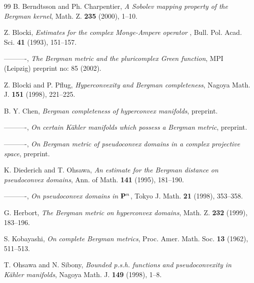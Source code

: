 \documentclass[12pt]{article}
\begin{document}
\begin{thebibliography}{99}
  B. Berndtsson and Ph. Charpentier, {\em A Sobolev mapping
property of the Bergman kernel}, Math. Z. {\bf 235} (2000), 1--10.

\bibitem{}  Z. Blocki, {\em Estimates for the complex Monge-Ampere operator}%
, Bull. Pol. Acad. Sci. {\bf 41} (1993), 151--157.

\bibitem{}  ----------, \emph{The Bergman metric and the pluricomplex Green
function}, MPI (Leipzig) preprint no: 85 (2002).

  Z. Blocki and P. Pflug, {\em Hyperconvexity and Bergman
completeness}, Nagoya Math. J. {\bf 151} (1998), 221--225.

\bibitem{} B. Y. Chen, \emph{Bergman completeness of hyperconvex
manifolds}, preprint.

\bibitem{} ----------, \emph{On certain K\"ahler manifolds which possess a Bergman
metric}, preprint.

\bibitem{} ----------, \emph{On Bergman metric of pseudoconvex domains in a complex projective space}, preprint.

\bibitem{}  K. Diederich and T. Ohsawa, {\em An estimate for the Bergman
distance on pseudoconvex domains}, Ann. of Math. {\bf 141} (1995),
181--190.

\bibitem{} ----------, \emph{On pseudoconvex domains in ${\bf
P}^n$}, Tokyo J. Math. {\bf 21} (1998), 353--358.

  G. Herbort, {\em The Bergman metric on hyperconvex domains},
Math. Z. {\bf 232} (1999), 183--196.


\bibitem{}  S. Kobayashi, {\em On complete Bergman metrics}, Proc. Amer. Math.
Soc. {\bf 13} (1962), 511--513.

\bibitem{} T. Ohsawa and N. Sibony, \emph{Bounded p.s.h. functions and
pseudoconvexity in K\"ahler manifolds}, Nagoya Math. J. {\bf 149}
(1998), 1--8.
\end{thebibliography}
\end{document}
